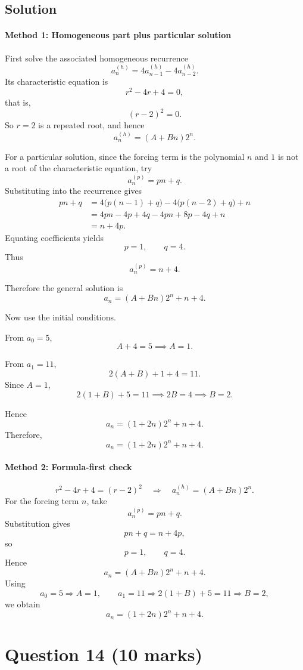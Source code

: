 \documentclass[12pt]{article}
\begin{document}
\subsection{Solution}

\paragraph{Method 1: Homogeneous part plus particular solution}

First solve the associated homogeneous recurrence
\[
a_n^{(h)}=4a_{n-1}^{(h)}-4a_{n-2}^{(h)}.
\]
Its characteristic equation is
\[
r^2-4r+4=0,
\]
that is,
\[
(r-2)^2=0.
\]
So $r=2$ is a repeated root, and hence
\[
a_n^{(h)}=(A+Bn)2^n.
\]

For a particular solution, since the forcing term is the polynomial $n$ and $1$ is not a root of the characteristic equation, try
\[
a_n^{(p)}=pn+q.
\]
Substituting into the recurrence gives
\begin{align*}
pn+q
&=4\bigl(p(n-1)+q\bigr)-4\bigl(p(n-2)+q\bigr)+n \\
&=4pn-4p+4q-4pn+8p-4q+n \\
&=n+4p.
\end{align*}
Equating coefficients yields
\[
p=1,
\qquad q=4.
\]
Thus
\[
a_n^{(p)}=n+4.
\]

Therefore the general solution is
\[
a_n=(A+Bn)2^n+n+4.
\]

Now use the initial conditions.

From $a_0=5$,
\[
A+4=5 \implies A=1.
\]

From $a_1=11$,
\[
2(A+B)+1+4=11.
\]
Since $A=1$,
\[
2(1+B)+5=11
\implies 2B=4
\implies B=2.
\]

Hence
\[
a_n=(1+2n)2^n+n+4.
\]
Therefore,
\[
\boxed{a_n=(1+2n)2^n+n+4.}
\]

\paragraph{Method 2: Formula-first check}

\[
r^2-4r+4=(r-2)^2
\quad\Longrightarrow\quad
 a_n^{(h)}=(A+Bn)2^n.
\]
For the forcing term $n$, take
\[
a_n^{(p)}=pn+q.
\]
Substitution gives
\[
pn+q=n+4p,
\]
so
\[
p=1,\qquad q=4.
\]
Hence
\[
a_n=(A+Bn)2^n+n+4.
\]
Using
\[
a_0=5\Rightarrow A=1,
\qquad
 a_1=11\Rightarrow 2(1+B)+5=11\Rightarrow B=2,
\]
we obtain
\[
\boxed{a_n=(1+2n)2^n+n+4.}
\]

\newpage
\section{Question 14 \hfill (10 marks)}
\end{document}
